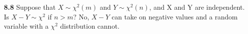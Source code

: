{\bf 8.8}  Suppose that $X\sim { \chi  }^{ 2 }(m)$ and $Y\sim { \chi  }^{ 2 }(n)$, and X and Y are independent. Is $X - Y \sim { \chi  }^{ 2 }$ if $n>m$? No, $X-Y$ can take on negative values and a random variable with a $\chi^2$ distribution cannot.